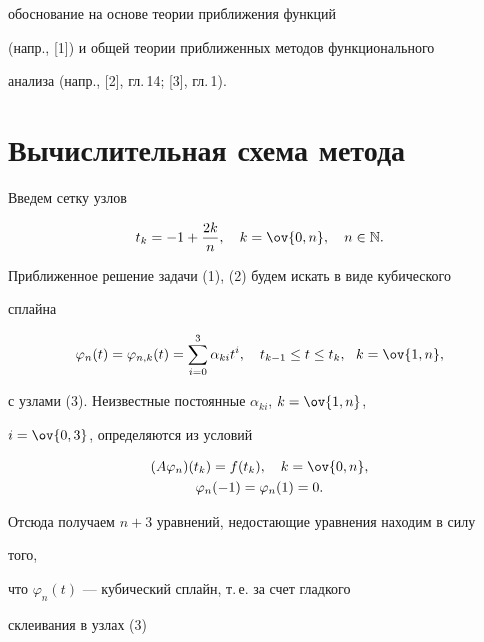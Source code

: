 обоснование на основе теории приближения функций 


(напр., [1]) и общей теории приближенных методов функционального 


анализа (напр., [2], гл.\,14; [3], гл.\,1). 


 


 


\section{Вычислительная схема метода} 


 


Введем сетку узлов 


\begin{equation} 


t_k=-1+\frac{2k}{n},\quad k=\ov{0,n},\quad n\in\Bbb N. 


\end{equation} 


Приближенное решение задачи (1), (2) будем искать в виде кубического 


сплайна 


\begin{equation} 


\varphi_n(t)=\varphi_{n,k}(t)=\sum^3_{i=0}\alpha_{ki}t^i,\quad 


t_{k-1}\le t\le t_k,\ \ k=\ov{1,n}, 


\end{equation} 


с узлами (3). Неизвестные постоянные $\alpha_{ki}$, $k=\ov{1,n}$, 


$i=\ov{0,3}$, определяются из условий 


\begin{gather} 


(A\varphi_n)(t_k)=f(t_k),\quad k=\ov{0,n}, \\ 


% 


\varphi_n(-1)=\varphi_n(1)=0. 


\end{gather} 


Отсюда получаем $n+3$ уравнений, недостающие уравнения находим в силу 


того, 


что $\varphi_n(t)$ --- кубический сплайн, т.\,е. за счет гладкого 


склеивания в узлах (3) 


